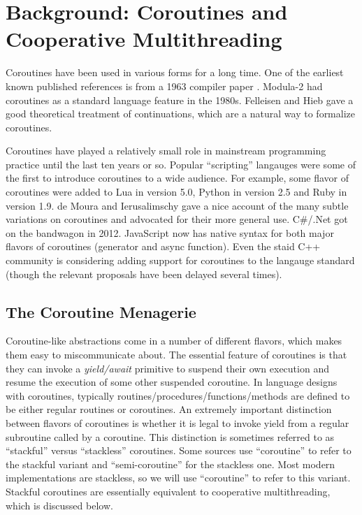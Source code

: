 \documentclass[a4paper,UKenglish,cleveref, autoref]{lipics-v2019}
\begin{document}
\section{Background: Coroutines and Cooperative Multithreading}

Coroutines have been used in various forms for a long time.
One of the earliest known published references is from a 1963 compiler paper \cite{Conway1963}.
Modula-2 had coroutines as a standard language feature in the 1980s.
Felleisen and Hieb \cite{HXXX} gave a good theoretical treatment of continuations, which are a natural way to formalize coroutines.

Coroutines have played a relatively small role in mainstream programming practice until the last ten years or so.
Popular ``scripting'' langauges were some of the first to introduce coroutines to a wide audience.
For example, some flavor of coroutines were added to Lua in version 5.0, Python in version 2.5 and Ruby in version 1.9.
de Moura and Ierusalimschy \cite{MouraXXX} gave a nice account of the many subtle variations on coroutines and advocated for their more general use.
C\#{\slash}.Net got on the bandwagon in 2012.
JavaScript now has native syntax for both major flavors of coroutines (generator and async function).
Even the staid C++ community is considering adding support for coroutines to the langauge standard (though the relevant proposals have been delayed several times).

\subsection{The Coroutine Menagerie}

Coroutine-like abstractions come in a number of different flavors, which makes them easy to miscommunicate about.
The essential feature of coroutines is that they can invoke a \emph{yield{\slash}await} primitive to suspend their own execution and resume the execution of some other suspended coroutine.
In language designs with coroutines, typically routines{\slash}procedures{\slash}functions{\slash}methods are defined to be either regular routines or coroutines.
An extremely important distinction between flavors of coroutines is whether it is legal to invoke yield from a regular subroutine called by a coroutine.
This distinction is sometimes referred to as ``stackful'' versus ``stackless'' coroutines.
Some sources use ``coroutine'' to refer to the stackful variant and ``semi-coroutine'' for the stackless one.
Most modern implementations are stackless, so we will use ``coroutine'' to refer to this variant.
Stackful coroutines are essentially equivalent to cooperative multithreading, which is discussed below.
\end{document}
